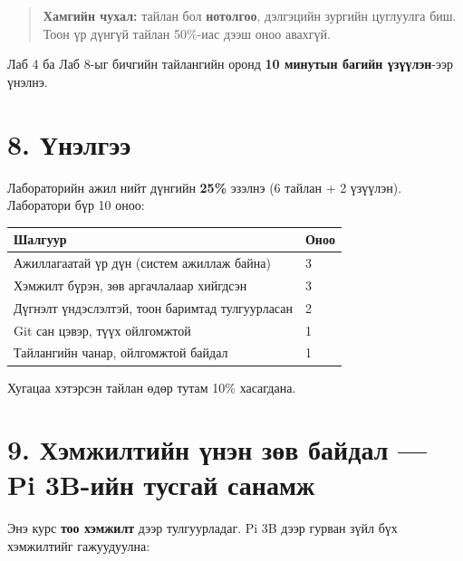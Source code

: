 \begin{quote}
\textbf{Хамгийн чухал:} тайлан бол \textbf{нотолгоо}, дэлгэцийн зургийн цуглуулга биш. Тоон үр дүнгүй тайлан 50\%-иас дээш оноо авахгүй.
\end{quote}

Лаб 4 ба Лаб 8-ыг бичгийн тайлангийн оронд \textbf{10 минутын багийн үзүүлэн}-ээр үнэлнэ.

\hypertarget{ux4afux43dux44dux43bux433ux44dux44d}{%
\section{8. Үнэлгээ}\label{ux4afux43dux44dux43bux433ux44dux44d}}

Лабораторийн ажил нийт дүнгийн \textbf{25\%} эзэлнэ (6 тайлан + 2 үзүүлэн). Лаборатори бүр 10 оноо:

\begingroup\scriptsize\begin{longtable}[]{@{}ll@{}}
\toprule
Шалгуур & Оноо\tabularnewline
\midrule
\endhead
Ажиллагаатай үр дүн (систем ажиллаж байна) & 3\tabularnewline
Хэмжилт бүрэн, зөв аргачлалаар хийгдсэн & 3\tabularnewline
Дүгнэлт үндэслэлтэй, тоон баримтад тулгуурласан & 2\tabularnewline
Git сан цэвэр, түүх ойлгомжтой & 1\tabularnewline
Тайлангийн чанар, ойлгомжтой байдал & 1\tabularnewline
\bottomrule
\end{longtable}\endgroup

Хугацаа хэтэрсэн тайлан өдөр тутам 10\% хасагдана.

\hypertarget{ux445ux44dux43cux436ux438ux43bux442ux438ux439ux43d-ux4afux43dux44dux43d-ux437ux4e9ux432-ux431ux430ux439ux434ux430ux43b-pi-3b-ux438ux439ux43d-ux442ux443ux441ux433ux430ux439-ux441ux430ux43dux430ux43cux436}{%
\section{9. Хэмжилтийн үнэн зөв байдал --- Pi 3B-ийн тусгай санамж}\label{ux445ux44dux43cux436ux438ux43bux442ux438ux439ux43d-ux4afux43dux44dux43d-ux437ux4e9ux432-ux431ux430ux439ux434ux430ux43b-pi-3b-ux438ux439ux43d-ux442ux443ux441ux433ux430ux439-ux441ux430ux43dux430ux43cux436}}

Энэ курс \textbf{тоо хэмжилт} дээр тулгуурладаг. Pi 3B дээр гурван зүйл бүх хэмжилтийг гажуудуулна:

